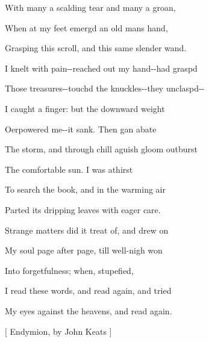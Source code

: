 With many a scalding tear and many a groan,$\text{ }$\newline{}

When at my feet emerg\textquotesingle{}d an old man\textquotesingle{}s hand,$\text{ }$\newline{}

Grasping this scroll, and this same slender wand.$\text{ }$\newline{}

I knelt with pain-{}-{}reached out my hand-{}-{}had grasp\textquotesingle{}d$\text{ }$\newline{}

Those treasures-{}-{}touch\textquotesingle{}d the knuckles-{}-{}they unclasp\textquotesingle{}d-{}-{}$\text{ }$\newline{}

I caught a finger: but the downward weight$\text{ }$\newline{}

O\textquotesingle{}erpowered me-{}-{}it sank. Then \textquotesingle{}gan abate$\text{ }$\newline{}

The storm, and through chill aguish gloom outburst$\text{ }$\newline{}

The comfortable sun. I was athirst$\text{ }$\newline{}

To search the book, and in the warming air$\text{ }$\newline{}

Parted its dripping leaves with eager care.$\text{ }$\newline{}

Strange matters did it treat of, and drew on$\text{ }$\newline{}

My soul page after page, till well-{}nigh won$\text{ }$\newline{}

Into forgetfulness; when, stupefied,$\text{ }$\newline{}

I read these words, and read again, and tried$\text{ }$\newline{}

My eyes against the heavens, and read again.$\text{ }$\newline{}




{$\text{[}$} Endymion, by John Keats {$\text{]}$} 

